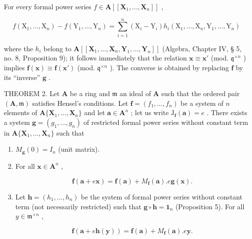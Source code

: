 For every formal power series \(f \in \mathbf{A}[[\mathbf{X}_1, \ldots, \mathbf{X}_n]]\) ,

\[
f \left(\mathrm{X} _ {1}, \dots , \mathrm{X} _ {n}\right) - f \left(\mathrm{Y} _ {1}, \dots , \mathrm{Y} _ {n}\right) = \sum_ {i = 1} ^ {n} \left(\mathrm{X} _ {i} - \mathrm{Y} _ {i}\right) h _ {i} \left(\mathrm{X} _ {1}, \dots , \mathrm{X} _ {n}, \mathrm{Y} _ {1}, \dots , \mathrm{Y} _ {n}\right)
\]

where the \(h_i\) belong to \(\mathbf{A}[[\mathbf{X}_1,\ldots,\mathbf{X}_n,\mathbf{Y}_1,\ldots,\mathbf{Y}_n]]\) (Algebra, Chapter IV, § 5, no. 8, Proposition 9); it follows immediately that the relation \(\mathbf{x} \equiv \mathbf{x}'\) (mod. \(\mathfrak{q}^{\times n}\) ) implies \(\mathbf{f}(\mathbf{x}) \equiv \mathbf{f}(\mathbf{x}')\) (mod. \(\mathfrak{q}^{\times n}\) ). The converse is obtained by replacing \(\mathbf{f}\) by its ``inverse'' \(\mathbf{g}\) .

THEOREM 2. Let \(\mathbf{A}\) be a ring and \(\mathfrak{m}\) an ideal of \(\mathbf{A}\) such that the ordered pair \((\mathbf{A},\mathfrak{m})\) satisfies Hensel's conditions. Let \(\mathbf{f} = (f_1,\ldots ,f_n)\) be a system of \(n\) elements of \(\mathbf{A}\{\mathbf{X}_1,\ldots ,\mathbf{X}_n\}\) and let \(\mathbf{a}\in \mathbf{A}^n\) ; let us write \(\mathrm{J}_{\mathbf{f}}(\mathbf{a}) = e\) . There exists a system \(\mathbf{g} = (g_1,\dots ,g_n)\) of restricted formal power series without constant term in \(\mathbf{A}\{\mathbf{X}_1,\dots ,\mathbf{X}_n\}\) such that

\begin{enumerate}
\def\labelenumi{(\roman{enumi})}
\item
  \(M_{\mathbf{g}}(0) = I_{n}\) (unit matrix).
\item
  For all \(\mathbf{x} \in \mathbf{A}^n\) ,

\[
\mathbf {f} (\mathbf {a} + e \mathbf {x}) = \mathbf {f} (\mathbf {a}) + M _ {\mathbf {f}} (\mathbf {a}). e \mathbf {g} (\mathbf {x}).\tag{19}
\]

\item
  Let \(\mathbf{h} = (h_1, \ldots, h_n)\) be the system of formal power series without constant term (not necessarily restricted) such that \(\mathbf{g} \circ \mathbf{h} = \mathbf{1}_n\) (Proposition 5). For all \(y \in \mathfrak{m}^{\times n}\) ,

\[
\mathbf {f} (\mathbf {a} + e \mathbf {h} (\mathbf {y})) = \mathbf {f} (\mathbf {a}) + M _ {\mathbf {f}} (\mathbf {a}). e \mathbf {y}.\tag{20}
\]

\end{enumerate}

